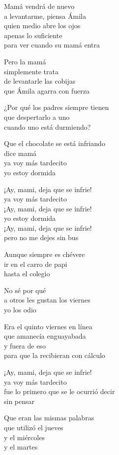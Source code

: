 \begin{lyrics}
Mamá vendrá de nuevo\\
a levantarme, piensa Ámila\\
quien medio abre los ojos\\
apenas lo suficiente\\
para ver cuando su mamá entra

Pero la mamá\\
simplemente trata\\
de levantarle las cobijas\\
que Ámila agarra con fuerza

¿Por qué los padres siempre tienen\\
que despertarlo a uno\\
cuando uno está durmiendo?

Que el chocolate se está infriando\\
dice mamá\\
ya voy más tardecito\\
yo estoy dormida

¡Ay, mami, deja que se infrie!\\
ya voy más tardecito\\
¡Ay, mami, deja que se infrie!\\
yo estoy dormida\\
¡Ay, mami, deja que se infrie!\\
pero no me dejes sin bus

Aunque siempre es chévere\\
ir en el carro de papi\\
hasta el colegio

No sé por qué\\
a otros les gustan los viernes\\
yo los odio

Era el quinto viernes en línea\\
que amanecía enguayabada\\
y fuera de eso\\
para que la recibieran con cálculo

¡Ay, mami, deja que se infrie!\\
ya voy más tardecito\\
fue lo primero que se le ocurrió decir\\
sin pensar

Que eran las mismas palabras\\
que utilizó el jueves\\
y el miércoles\\
y el martes


\end{lyrics}
